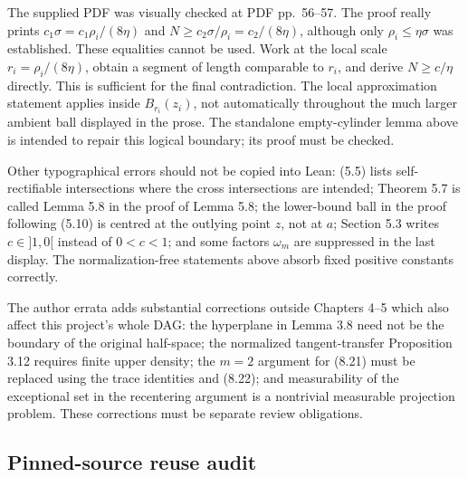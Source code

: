 The supplied PDF was visually checked at PDF pp.~56--57. The proof really
prints $c_1\sigma=c_1\rho_i/(8\eta)$ and
$N\geq c_2\sigma/\rho_i=c_2/(8\eta)$, although only
$\rho_i\leq\eta\sigma$ was established. These equalities cannot be used.
Work at the local scale $r_i=\rho_i/(8\eta)$, obtain a segment of length
comparable to $r_i$, and derive $N\geq c/\eta$ directly. This is sufficient
for the final contradiction. The local approximation statement applies
inside $B_{r_i}(z_i)$, not automatically throughout the much larger ambient
ball displayed in the prose. The standalone empty-cylinder lemma above is
intended to repair this logical boundary; its proof must be checked.

Other typographical errors should not be copied into Lean: (5.5) lists
self-rectifiable intersections where the cross intersections are intended;
Theorem 5.7 is called Lemma 5.8 in the proof of Lemma 5.8; the lower-bound
ball in the proof following (5.10) is centred at the outlying point $z$, not
at $a$; Section 5.3 writes $c\in]1,0[$ instead of $0<c<1$; and some factors
$\omega_m$ are suppressed in the last display. The normalization-free
statements above absorb fixed positive constants correctly.

The author errata adds substantial corrections outside Chapters 4--5 which
also affect this project's whole DAG: the hyperplane in Lemma 3.8 need not
be the boundary of the original half-space; the normalized tangent-transfer
Proposition 3.12 requires finite upper density; the $m=2$ argument for (8.21)
must be replaced using the trace identities and (8.22); and measurability of
the exceptional set in the recentering argument is a nontrivial measurable
projection problem. These corrections must be separate review obligations.

\subsection{Pinned-source reuse audit}


